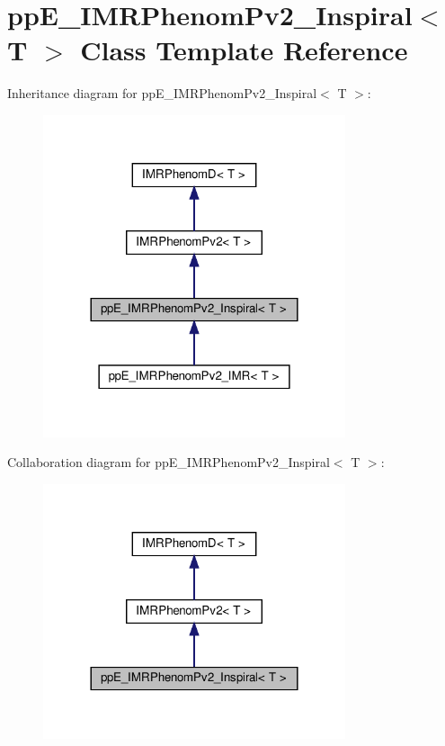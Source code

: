 \hypertarget{classppE__IMRPhenomPv2__Inspiral}{}\section{pp\+E\+\_\+\+I\+M\+R\+Phenom\+Pv2\+\_\+\+Inspiral$<$ T $>$ Class Template Reference}
\label{classppE__IMRPhenomPv2__Inspiral}


Inheritance diagram for pp\+E\+\_\+\+I\+M\+R\+Phenom\+Pv2\+\_\+\+Inspiral$<$ T $>$\+:\nopagebreak
\begin{figure}[H]
\begin{center}
\leavevmode
\includegraphics[width=252pt]{classppE__IMRPhenomPv2__Inspiral__inherit__graph}
\end{center}
\end{figure}


Collaboration diagram for pp\+E\+\_\+\+I\+M\+R\+Phenom\+Pv2\+\_\+\+Inspiral$<$ T $>$\+:\nopagebreak
\begin{figure}[H]
\begin{center}
\leavevmode
\includegraphics[width=252pt]{classppE__IMRPhenomPv2__Inspiral__coll__graph}
\end{center}
\end{figure}
